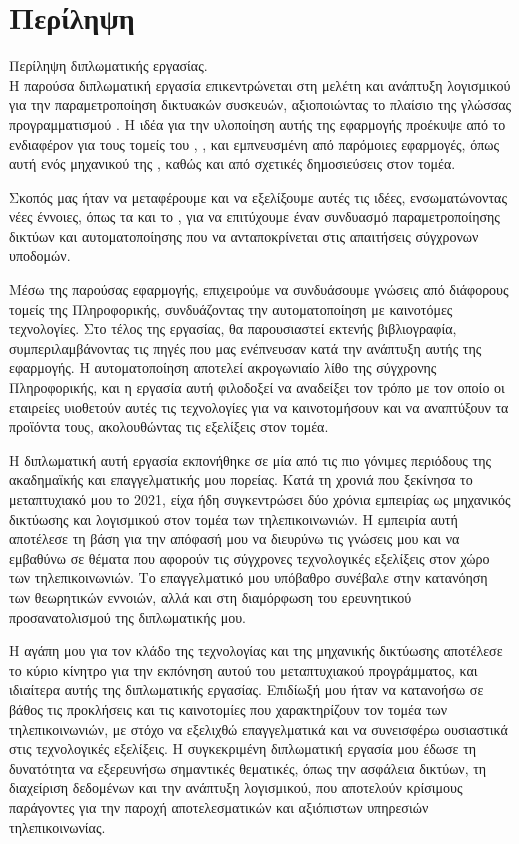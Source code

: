 \chapter*{Περίληψη}

Περίληψη διπλωματικής εργασίας.\\

\noindent Η παρούσα διπλωματική εργασία επικεντρώνεται στη μελέτη και ανάπτυξη λογισμικού για την παραμετροποίηση δικτυακών συσκευών, 
αξιοποιώντας το πλαίσιο  της γλώσσας προγραμματισμού . Η ιδέα για την υλοποίηση αυτής της εφαρμογής προέκυψε από το ενδιαφέρον 
για τους τομείς του , , και  εμπνευσμένη από παρόμοιες εφαρμογές, όπως αυτή ενός μηχανικού της , 
καθώς και από σχετικές δημοσιεύσεις στον τομέα.

Σκοπός μας ήταν να μεταφέρουμε και να εξελίξουμε αυτές τις ιδέες, ενσωματώνοντας νέες έννοιες, όπως τα  και το , 
για να επιτύχουμε έναν συνδυασμό παραμετροποίησης δικτύων και αυτοματοποίησης που να ανταποκρίνεται στις απαιτήσεις σύγχρονων υποδομών.

Μέσω της παρούσας εφαρμογής, επιχειρούμε να συνδυάσουμε γνώσεις από διάφορους τομείς της Πληροφορικής, συνδυάζοντας την αυτοματοποίηση με 
καινοτόμες τεχνολογίες. Στο τέλος της εργασίας, θα παρουσιαστεί εκτενής βιβλιογραφία, συμπεριλαμβάνοντας τις πηγές που μας ενέπνευσαν κατά την 
ανάπτυξη αυτής της εφαρμογής. Η αυτοματοποίηση αποτελεί ακρογωνιαίο λίθο της σύγχρονης Πληροφορικής, και η εργασία αυτή φιλοδοξεί να αναδείξει τον 
τρόπο με τον οποίο οι εταιρείες υιοθετούν αυτές τις τεχνολογίες για να καινοτομήσουν και να αναπτύξουν τα προϊόντα τους, ακολουθώντας τις εξελίξεις στον τομέα.

Η διπλωματική αυτή εργασία εκπονήθηκε σε μία από τις πιο γόνιμες περιόδους της ακαδημαϊκής και επαγγελματικής μου πορείας. 
Κατά τη χρονιά που ξεκίνησα το μεταπτυχιακό μου το 2021, είχα ήδη συγκεντρώσει δύο χρόνια εμπειρίας ως μηχανικός δικτύωσης και λογισμικού στον τομέα των 
τηλεπικοινωνιών. Η εμπειρία αυτή αποτέλεσε τη βάση για την απόφασή μου να διευρύνω τις γνώσεις μου και να εμβαθύνω σε θέματα που αφορούν τις σύγχρονες 
τεχνολογικές εξελίξεις στον χώρο των τηλεπικοινωνιών. Το επαγγελματικό μου υπόβαθρο συνέβαλε στην κατανόηση των θεωρητικών εννοιών, αλλά και στη διαμόρφωση 
του ερευνητικού προσανατολισμού της διπλωματικής μου.

Η αγάπη μου για τον κλάδο της τεχνολογίας και της μηχανικής δικτύωσης αποτέλεσε το κύριο κίνητρο για την εκπόνηση 
αυτού του μεταπτυχιακού προγράμματος, και ιδιαίτερα αυτής της διπλωματικής εργασίας. Επιδίωξή μου ήταν να κατανοήσω σε βάθος τις προκλήσεις και τις 
καινοτομίες που χαρακτηρίζουν τον τομέα των τηλεπικοινωνιών, με στόχο να εξελιχθώ επαγγελματικά και να συνεισφέρω ουσιαστικά στις τεχνολογικές εξελίξεις. 
Η συγκεκριμένη διπλωματική εργασία μου έδωσε τη δυνατότητα να εξερευνήσω σημαντικές θεματικές, όπως την ασφάλεια δικτύων, τη διαχείριση δεδομένων και την 
ανάπτυξη λογισμικού, που αποτελούν κρίσιμους παράγοντες για την παροχή αποτελεσματικών και αξιόπιστων υπηρεσιών τηλεπικοινωνίας.

